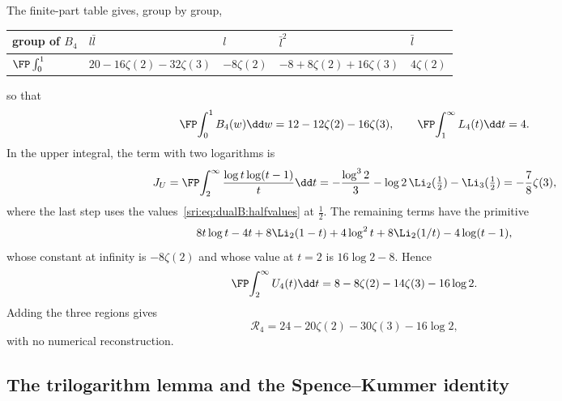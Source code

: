 The finite-part table gives, group by group,
\begin{center}\small
\begin{tabular}{@{}lllll@{}}
\toprule
group of $B_4$ & $l\bar l$ & $l$ & $\bar l^2$ & $\bar l$\\
\midrule
$\FP\int_0^1$ & $20-16\zeta(2)-32\zeta(3)$ & $-8\zeta(2)$ & $-8+8\zeta(2)+16\zeta(3)$ & $4\zeta(2)$\\
\bottomrule
\end{tabular}
\end{center}
so that
\begin{equation}
 \FP\!\int_0^1B_4(w)\dd w=12-12\zeta(2)-16\zeta(3),\qquad \FP\!\int_1^\infty L_4(t)\dd t=4.
\end{equation}
In the upper integral, the term with two logarithms is
\begin{equation}
 J_U=\FP\!\int_2^\infty\frac{\log t\log(t-1)}{t}\dd t=-\frac{\log^32}{3}-\log2\,\Li_2(\tfrac12)-\Li_3(\tfrac12)
 =-\frac78\zeta(3),
 \label{sri:eq:dualB:JU}
\end{equation}
where the last step uses the values~\eqref{sri:eq:dualB:halfvalues} at $\frac12$. The remaining terms have the primitive
\begin{equation}
 8t\log t-4t+8\Li_2(1-t)+4\log^2t+8\Li_2(1/t)-4\log(t-1),
\end{equation}
whose constant at infinity is $-8\zeta(2)$ and whose value at $t=2$ is $16\log2-8$. Hence
\begin{equation}
 \FP\!\int_2^\infty U_4(t)\dd t=8-8\zeta(2)-14\zeta(3)-16\log2.
\end{equation}
Adding the three regions gives
\begin{equation}
 \mathcal R_4=24-20\zeta(2)-30\zeta(3)-16\log2,
 \label{sri:eq:dualB:Rclosed}
\end{equation}
with no numerical reconstruction.

\subsection{The trilogarithm lemma and the Spence--Kummer identity}\label{sri:app:dualB:trilog}
